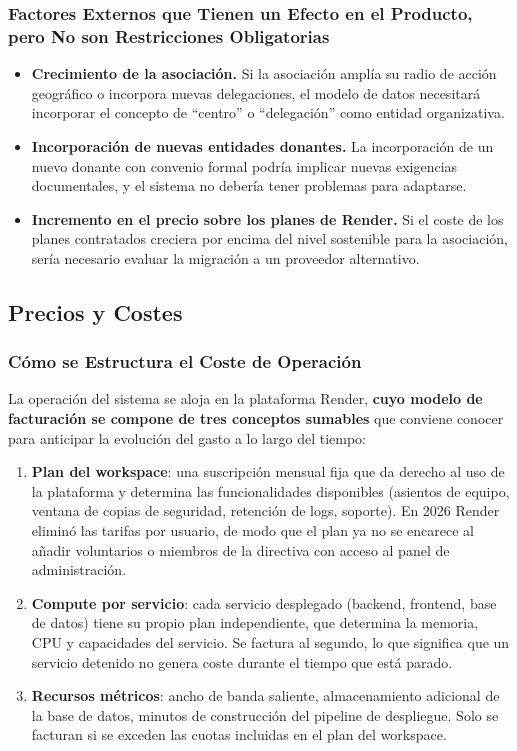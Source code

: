 \subsubsection{Factores Externos que Tienen un Efecto en el Producto, pero No son Restricciones Obligatorias}
\begin{itemize}
    \item \textbf{Crecimiento de la asociación.} Si la asociación amplía su radio de
    acción geográfico o incorpora nuevas delegaciones, el modelo de datos
    necesitará incorporar el concepto de ``centro'' o ``delegación'' como
    entidad organizativa.
    
    \item \textbf{Incorporación de nuevas entidades donantes.} La incorporación de
    un nuevo donante con convenio formal podría implicar nuevas
    exigencias documentales, y el sistema no debería tener problemas para adaptarse.
    
    \item \textbf{Incremento en el precio sobre los planes de Render.} Si el coste de
    los planes contratados creciera por encima del nivel sostenible para
    la asociación, sería necesario evaluar la migración a un proveedor
    alternativo.
\end{itemize}


\subsection{Precios y Costes}
\subsubsection{Cómo se Estructura el Coste de Operación}
La operación del sistema se aloja en la plataforma Render, \textbf{cuyo modelo de
facturación se compone de tres conceptos sumables} que conviene conocer
para anticipar la evolución del gasto a lo largo del tiempo:
\begin{enumerate}
    \item \textbf{Plan del workspace}: una suscripción mensual fija que da derecho al
    uso de la plataforma y determina las funcionalidades disponibles
    (asientos de equipo, ventana de copias de seguridad, retención de
    logs, soporte). En 2026 Render eliminó las tarifas por usuario, de
    modo que el plan ya no se encarece al añadir voluntarios o miembros
    de la directiva con acceso al panel de administración.

    \item \textbf{Compute por servicio}: cada servicio desplegado (backend,
   frontend, base de datos) tiene su propio plan independiente, que
   determina la memoria, CPU y capacidades del servicio. Se factura
   al segundo, lo que significa que un servicio detenido
   no genera coste durante el tiempo que está parado.

   \item \textbf{Recursos métricos}: ancho de banda saliente, almacenamiento
   adicional de la base de datos, minutos de construcción del pipeline
   de despliegue. Solo se facturan si se exceden las cuotas incluidas
   en el plan del workspace.
\end{enumerate}

